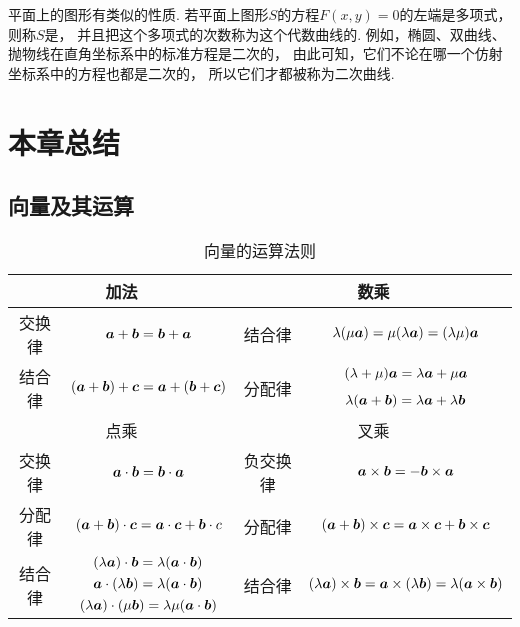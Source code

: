 平面上的图形有类似的性质.
若平面上图形\(S\)的方程\(F(x,y)=0\)的左端是多项式，
则称\(S\)是，
并且把这个多项式的次数称为这个代数曲线的.
例如，椭圆、双曲线、抛物线在直角坐标系中的标准方程是二次的，
由此可知，它们不论在哪一个仿射坐标系中的方程也都是二次的，
所以它们才都被称为二次曲线.


\section{本章总结}
\subsection*{向量及其运算}
\begin{table}[htb]
	\centering
	\begin{tabular}{|c|c|c|c|}
	\hline
	\multicolumn{2}{|c|}{加法} & \multicolumn{2}{c|}{数乘} \\ \hline
	交换律 & \(\boldsymbol{a}+\boldsymbol{b}=\boldsymbol{b}+\boldsymbol{a}\) &
		结合律 & \(\lambda(\mu\boldsymbol{a})=\mu(\lambda\boldsymbol{a})=(\lambda\mu)\boldsymbol{a}\) \\ \hline
	\multirow{2}{*}{结合律} & \multirow{2}{*}{\((\boldsymbol{a}+\boldsymbol{b})+\boldsymbol{c}=\boldsymbol{a}+(\boldsymbol{b}+\boldsymbol{c})\)} &
		\multirow{2}{*}{分配律} & \((\lambda+\mu)\boldsymbol{a}=\lambda\boldsymbol{a}+\mu\boldsymbol{a}\) \\
	 & & & \(\lambda(\boldsymbol{a}+\boldsymbol{b})=\lambda\boldsymbol{a}+\lambda\boldsymbol{b}\) \\ \hline
	\multicolumn{2}{|c|}{点乘} & \multicolumn{2}{c|}{叉乘} \\ \hline
	交换律 & \(\boldsymbol{a}\cdot\boldsymbol{b}=\boldsymbol{b}\cdot\boldsymbol{a}\) &
		负交换律 & \(\boldsymbol{a}\times\boldsymbol{b}=-\boldsymbol{b}\times\boldsymbol{a}\) \\ \hline
	分配律 & \((\boldsymbol{a}+\boldsymbol{b})\cdot\boldsymbol{c}=\boldsymbol{a}\cdot\boldsymbol{c}+\boldsymbol{b}\cdot{c}\) &
		分配律 & \((\boldsymbol{a}+\boldsymbol{b})\times\boldsymbol{c}=\boldsymbol{a}\times\boldsymbol{c}+\boldsymbol{b}\times\boldsymbol{c}\) \\ \hline
	\multirow{3}{*}{结合律} & \((\lambda\boldsymbol{a})\cdot\boldsymbol{b}=\lambda(\boldsymbol{a}\cdot\boldsymbol{b})\) & \multirow{3}{*}{结合律} & \multirow{3}{*}{\((\lambda\boldsymbol{a})\times\boldsymbol{b}=\boldsymbol{a}\times(\lambda\boldsymbol{b})=\lambda(\boldsymbol{a}\times\boldsymbol{b})\)} \\
		& \(\boldsymbol{a}\cdot(\lambda\boldsymbol{b})=\lambda(\boldsymbol{a}\cdot\boldsymbol{b})\) & & \\
		& \((\lambda\boldsymbol{a})\cdot(\mu\boldsymbol{b})=\lambda\mu(\boldsymbol{a}\cdot\boldsymbol{b})\) & & \\
	\hline
	\end{tabular}
	\caption{向量的运算法则}
\end{table}

